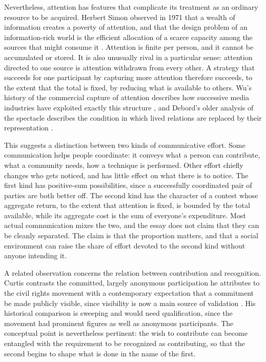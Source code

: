 \documentclass[11pt]{article}
\theoremstyle{definition}
\theoremstyle{remark}
\begin{document}
Nevertheless, attention has features that complicate its treatment as an ordinary resource to be acquired. Herbert Simon observed in 1971 that a wealth of information creates a poverty of attention, and that the design problem of an information-rich world is the efficient allocation of a scarce capacity among the sources that might consume it \cite{simon1971}. Attention is finite per person, and it cannot be accumulated or stored. It is also unusually rival in a particular sense: attention directed to one source is attention withdrawn from every other. A strategy that succeeds for one participant by capturing more attention therefore succeeds, to the extent that the total is fixed, by reducing what is available to others. Wu's history of the commercial capture of attention describes how successive media industries have exploited exactly this structure \cite{wu2016}, and Debord's older analysis of the spectacle describes the condition in which lived relations are replaced by their representation \cite{debord1967}.

This suggests a distinction between two kinds of communicative effort. Some communication helps people coordinate: it conveys what a person can contribute, what a community needs, how a technique is performed. Other effort chiefly changes who gets noticed, and has little effect on what there is to notice. The first kind has positive-sum possibilities, since a successfully coordinated pair of parties are both better off. The second kind has the character of a contest whose aggregate return, to the extent that attention is fixed, is bounded by the total available, while its aggregate cost is the sum of everyone's expenditure. Most actual communication mixes the two, and the essay does not claim that they can be cleanly separated. The claim is that the proportion matters, and that a social environment can raise the share of effort devoted to the second kind without anyone intending it.

A related observation concerns the relation between contribution and recognition. Curtis contrasts the committed, largely anonymous participation he attributes to the civil rights movement with a contemporary expectation that a commitment be made publicly visible, since visibility is now a main source of validation \cite{brandcurtis2016}. His historical comparison is sweeping and would need qualification, since the movement had prominent figures as well as anonymous participants. The conceptual point is nevertheless pertinent: the wish to contribute can become entangled with the requirement to be recognized as contributing, so that the second begins to shape what is done in the name of the first.
\end{document}
